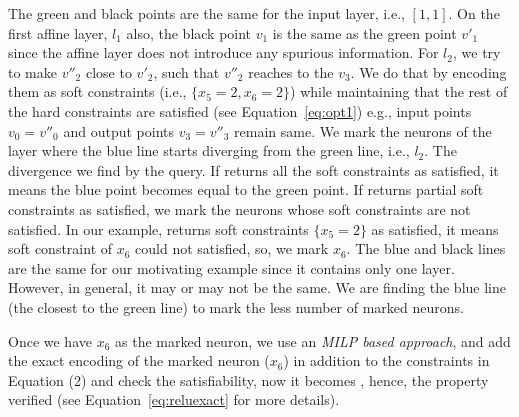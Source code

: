The green and black points are the same for the input layer, i.e., $[1,1]$. On the first affine layer, $l_1$ 
also, the black point $v_1$ is the same as the green point $v'_1$ since the affine layer does not introduce any spurious information. 
For $l_2$, we try to make $v''_2$ close to $v'_2$, such that $v''_2$ reaches to the $v_3$. We do that by encoding 
them as soft constraints (i.e.,  $\{x_5=2, x_6=2\}$) 
while maintaining that the rest of the hard constraints are satisfied (see Equation~\ref{eq:opt1})
e.g., input points $v_0=v''_0$ and output points $v_3=v''_3$ remain same. 
We mark the neurons of the layer where the blue line starts diverging from the green line, i.e., $l_2$. 
The divergence we find by the \maxsat{} query. If \maxsat{} returns all the soft constraints as satisfied, it means
the blue point becomes equal to the green point. If \maxsat{} returns partial soft constraints as satisfied, 
we mark the neurons whose soft constraints are not satisfied. In our example, \maxsat{} returns 
soft constraints $\{x_5=2\}$ as satisfied, it means soft constraint of $x_6$ could not satisfied, so, we mark $x_6$.
The blue and black lines are the same for our motivating example since it contains only one \relu{} layer. 
However, in general, it may or may not be the same. We are finding the blue line (the closest to the green line) to mark the 
less number of marked neurons. 




\noindent  
{}\;\;
  \begin{minipage}{0.42\linewidth}
Once we have  $x_6$ as the marked neuron, we use an {\em MILP based approach}, and add the exact encoding of the marked neuron ($x_6$) in addition to the constraints in Equation (2) %
and check the satisfiability, now it becomes \unsat{}, hence, the property verified (see Equation~\ref{eq:reluexact} for more details).
\end{minipage}

